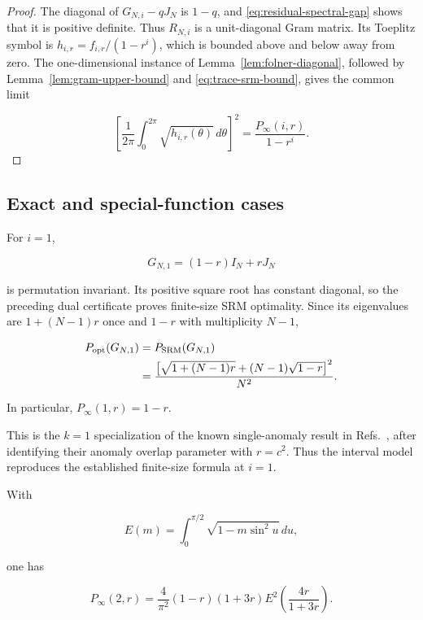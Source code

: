 \begin{proof}
The diagonal of \(G_{N,i}-qJ_N\) is \(1-q\), and
\eqref{eq:residual-spectral-gap} shows that it is positive definite. Thus
\(R_{N,i}\) is a unit-diagonal Gram matrix. Its Toeplitz symbol is
\(h_{i,r}=f_{i,r}/(1-r^i)\), which is bounded above and below away from zero.
The one-dimensional instance of Lemma~\ref{lem:folner-diagonal}, followed by
Lemma~\ref{lem:gram-upper-bound} and \eqref{eq:trace-srm-bound}, gives the common
limit

\[
\left[\frac1{2\pi}\int_0^{2\pi}\sqrt{h_{i,r}(\theta)}\,d\theta\right]^2
=\frac{P_\infty(i,r)}{1-r^i}.
\]
\end{proof}

\subsection{Exact and special-function cases}\label{exact-and-special-function-cases}

\begin{corollary}\label{cor:one-site}
For \(i=1\),

\[
G_{N,1}=(1-r)I_N+rJ_N
\]

is permutation invariant. Its positive square root has constant diagonal, so the preceding dual certificate proves finite-size SRM optimality. Since its eigenvalues are \(1+(N-1)r\) once and \(1-r\) with multiplicity \(N-1\),

\begin{align}\label{eq:one-site-finite}
P_{\rm opt}(G_{N,1})
&=P_{\rm SRM}(G_{N,1}) \notag\\
&=\frac{\bigl[\sqrt{1+(N-1)r}
+(N-1)\sqrt{1-r}\bigr]^2}{N^2}.
\end{align}

In particular, \(P_\infty(1,r)=1-r\).

This is the \(k=1\) specialization of the known single-anomaly result in
Refs.~\cite{skotiniotis2024,llorens2024}, after identifying their anomaly
overlap parameter with \(r=c^2\). Thus the interval model reproduces the
established finite-size formula at \(i=1\).
\end{corollary}

\begin{corollary}\label{cor:two-site}
With

\[
E(m)=\int_0^{\pi/2}\sqrt{1-m\sin^2u}\,du,
\]

one has

\begin{equation}\label{eq:two-site-elliptic}
P_\infty(2,r)
=\frac4{\pi^2}(1-r)(1+3r)
E^2\!\left(\frac{4r}{1+3r}\right).
\end{equation}
\end{corollary}

